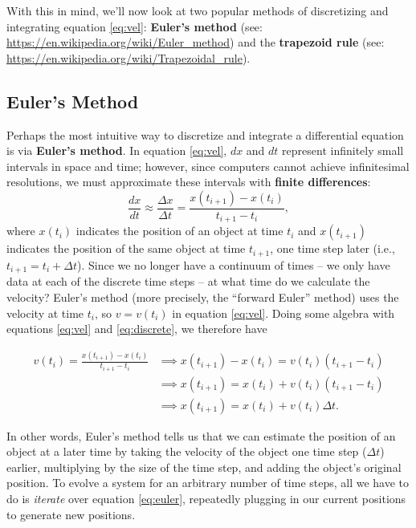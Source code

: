 \documentclass[11pt]{article}
\begin{document}
\noindent
With this in mind, we'll now look at two popular methods of discretizing and integrating equation \ref{eq:vel}: \textbf{Euler's method} (see: \url{https://en.wikipedia.org/wiki/Euler_method}) and the \textbf{trapezoid rule} (see: \url{https://en.wikipedia.org/wiki/Trapezoidal_rule}).

\subsection{Euler's Method} \label{sec:eulermethod}
Perhaps the most intuitive way to discretize and integrate a differential equation is via \textbf{Euler's method}. In equation \ref{eq:vel}, $dx$ and $dt$ represent infinitely small intervals in space and time; however, since computers cannot achieve infinitesimal resolutions, we must approximate these intervals with \textbf{finite differences}:
\begin{equation} \label{eq:discrete}
    \frac{dx}{dt} \approx \frac{\Delta x}{\Delta t} = \frac{x(t_{i+1}) - x(t_i)}{t_{i+1} - t_i},
\end{equation}
where $x(t_i)$ indicates the position of an object at time $t_i$ and $x(t_{i+1})$ indicates the position of the same object at time $t_{i+1}$, one time step later (i.e., $t_{i+1} = t_i + \Delta t$). Since we no longer have a continuum of times -- we only have data at each of the discrete time steps -- at what time do we calculate the velocity? Euler's method (more precisely, the ``forward Euler'' method) uses the velocity at time $t_i$, so $v = v(t_i)$ in equation \ref{eq:vel}. Doing some algebra with equations \ref{eq:vel} and \ref{eq:discrete}, we therefore have 

\begin{align} \label{eq:euler}
    v(t_i) = \frac{x(t_{i+1}) - x(t_i)}{t_{i+1} - t_i} &\implies x(t_{i+1}) - x(t_i) = v(t_i)(t_{i+1} - t_i) \nonumber \\ &\implies x(t_{i+1}) = x(t_i) + v(t_i)(t_{i+1} - t_i)  \nonumber \\ &\implies \boxed{x(t_{i+1}) = x(t_i) + v(t_i)\Delta t}.
\end{align}

\noindent
In other words, Euler's method tells us that we can estimate the position of an object at a later time by taking the velocity of the object one time step ($\Delta t$) earlier, multiplying by the size of the time step, and adding the object's original position. To evolve a system for an arbitrary number of time steps, all we have to do is \textit{iterate} over equation \ref{eq:euler}, repeatedly plugging in our current positions to generate new positions.
\end{document}
